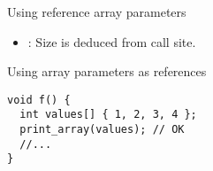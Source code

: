 \begin{frame}[t,fragile]{Using reference array parameters}
\begin{itemize}
  \item {}: Size is deduced from call site.
\end{itemize}

\begin{block}{Using array parameters as references}
\begin{lstlisting}
void f() {
  int values[] { 1, 2, 3, 4 };
  print_array(values); // OK
  //...
}
\end{lstlisting}
\end{block}
\end{frame}
